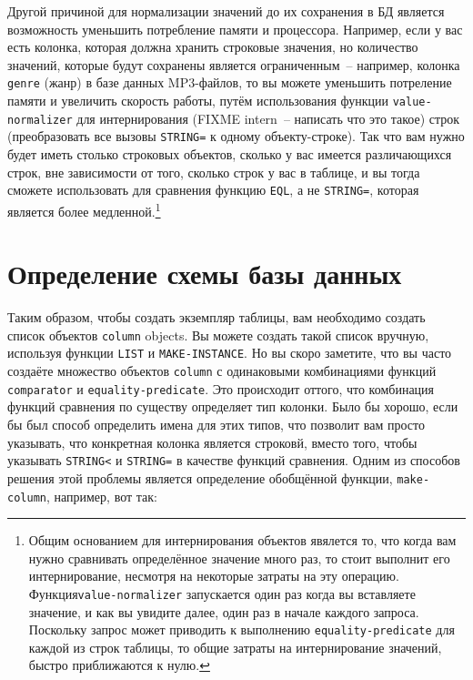 Другой причиной для нормализации значений до их сохранения в БД является возможность
уменьшить потребление памяти и процессора.  Например, если у вас есть колонка, которая
должна хранить строковые значения, но количество значений, которые будут сохранены
является ограниченным~-- например, колонка \lstinline{genre} (жанр) в базе данных MP3-файлов,
то вы можете уменьшить потреление памяти и увеличить скорость работы, путём использования
функции \lstinline{value-normalizer} для интернирования (FIXME intern~-- написать что это
такое) строк (преобразовать все вызовы \lstinline{STRING=} к одному объекту-строке).  Так что
вам нужно будет иметь столько строковых объектов, сколько у вас имеется различающихся
строк, вне зависимости от того, сколько строк у вас в таблице, и вы тогда сможете
использовать для сравнения функцию \lstinline{EQL}, а не \lstinline{STRING=}, которая является более
медленной.\footnote{Общим основанием для интернирования объектов явялется то, что когда
    вам нужно сравнивать определённое значение много раз, то стоит выполнит его
    интернирование, несмотря на некоторые затраты на эту операцию.
    Функция\lstinline{value-normalizer} запускается один раз когда вы вставляете значение, и
    как вы увидите далее, один раз в начале каждого запроса. Поскольку запрос может
    приводить к выполнению \lstinline{equality-predicate} для каждой из строк таблицы, то общие
затраты на интернирование значений, быстро приближаются к нулю.}

\section{Определение схемы базы данных}

Таким образом, чтобы создать экземпляр таблицы, вам необходимо создать список объектов
\lstinline{column} objects.  Вы можете создать такой список вручную, используя функции
\lstinline{LIST} и \lstinline{MAKE-INSTANCE}.  Но вы скоро заметите, что вы часто создаёте множество
объектов \lstinline{column} с одинаковыми комбинациями функций \lstinline{comparator} и
\lstinline{equality-predicate}. Это происходит оттого, что комбинация функций сравнения по
существу определяет тип колонки. Было бы хорошо, если бы был способ определить имена для
этих типов, что позволит вам просто указывать, что конкретная колонка является строковй,
вместо того, чтобы указывать \lstinline{STRING<} и \lstinline{STRING=} в качестве функций сравнения.
Одним из способов решения этой проблемы является определение обобщённой функции,
\lstinline{make-column}, например, вот так:

